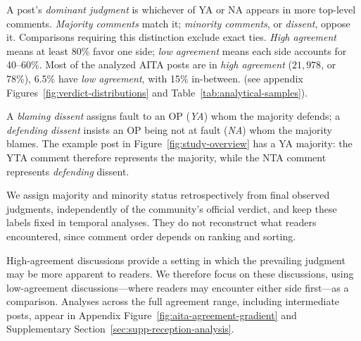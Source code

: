 A post’s \emph{dominant judgment} is whichever of YA or NA appears in more top-level comments.
\emph{Majority comments} match it; \emph{minority comments}, or \emph{dissent}, oppose it.
Comparisons requiring this distinction exclude exact ties.
\emph{High agreement} means at least 80\% favor one side;
\emph{low agreement} means each side accounts for 40--60\%.
Most of the analyzed AITA posts are in \emph{high agreement} ($21,978$, or 78\%), 6.5\% have \emph{low agreement}, with 15\% in-between.
(see appendix Figures~\ref{fig:verdict-distributions} and Table~\ref{tab:analytical-samples}).

A \emph{blaming dissent} assigns fault to an OP (\emph{YA}) whom the majority defends;
a \emph{defending dissent} insists an OP being not at fault (\emph{NA}) whom the majority blames.
The example post in Figure~\ref{fig:study-overview} has a YA majority:
the YTA comment therefore represents the majority, while the NTA
comment represents {\it defending} dissent.


We assign majority and minority status retrospectively from final observed judgments, independently of the community’s official verdict, and keep these labels fixed in temporal analyses. They do not reconstruct what readers encountered, since comment order depends on ranking and sorting.

High-agreement discussions provide a setting in which the prevailing judgment may be more apparent to readers. We therefore focus on these discussions, using low-agreement discussions—where readers may encounter either side first—as a comparison.
Analyses across the full agreement range, including intermediate posts, appear in Appendix Figure~\ref{fig:aita-agreement-gradient} and Supplementary Section~\ref{sec:supp-reception-analysis}.



